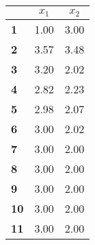 \begin{small}\begin{tabular}{|l|c|c|}
\hline
&\textbf{$x_1$}&\textbf{$x_2$}\\\hline
\textbf{1}&1.00&3.00\\\hline
\textbf{2}&3.57&3.48\\\hline
\textbf{3}&3.20&2.02\\\hline
\textbf{4}&2.82&2.23\\\hline
\textbf{5}&2.98&2.07\\\hline
\textbf{6}&3.00&2.02\\\hline
\textbf{7}&3.00&2.00\\\hline
\textbf{8}&3.00&2.00\\\hline
\textbf{9}&3.00&2.00\\\hline
\textbf{10}&3.00&2.00\\\hline
\textbf{11}&3.00&2.00\\\hline
\end{tabular}
\end{small}